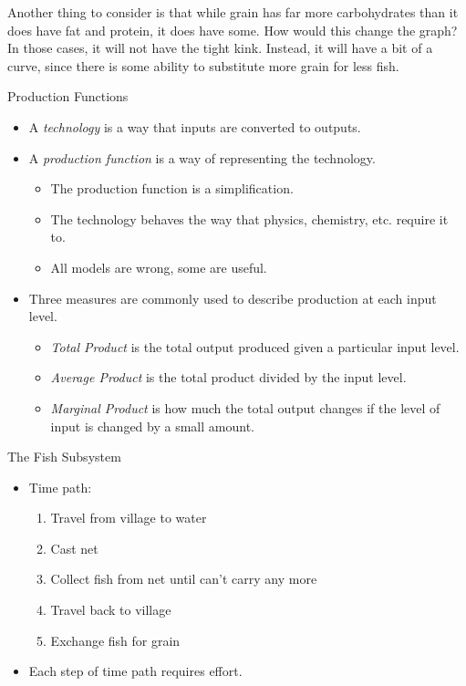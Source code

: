 {	Another thing to consider is that while grain has far more carbohydrates than it does have fat and protein, it does have some.  How would this change the graph?  In those cases, it will not have the tight kink.  Instead, it will have a bit of a curve, since there is some ability to substitute more grain for less fish.
}

\begin{frame}{Production Functions}
	\begin{itemize}
		\item A \emph{technology} is a way that inputs are converted to outputs.
		\item A \emph{production function} is a way of representing the technology.
		\begin{itemize}
			\item The production function is a simplification.
			\item The technology behaves the way that physics, chemistry, etc. require it to.
			\item All models are wrong, some are useful.
		\end{itemize}
		\item Three measures are commonly used to describe production at each input level.
		\begin{itemize}
			\item \emph{Total Product} is the total output produced given a particular input level.
			\item \emph{Average Product} is the total product divided by the input level.
			\item \emph{Marginal Product} is how much the total output changes if the level of input is changed by a small amount.
		\end{itemize}
	\end{itemize}
\end{frame}

\begin{frame}{The Fish Subsystem}
	\begin{itemize}
		\item Time path:
		\begin{enumerate}
			\item Travel from village to water
			\item Cast net
			\item Collect fish from net until can't carry any more
			\item Travel back to village
			\item Exchange fish for grain
		\end{enumerate}
		\item Each step of time path requires effort.
	\end{itemize}
\end{frame}

